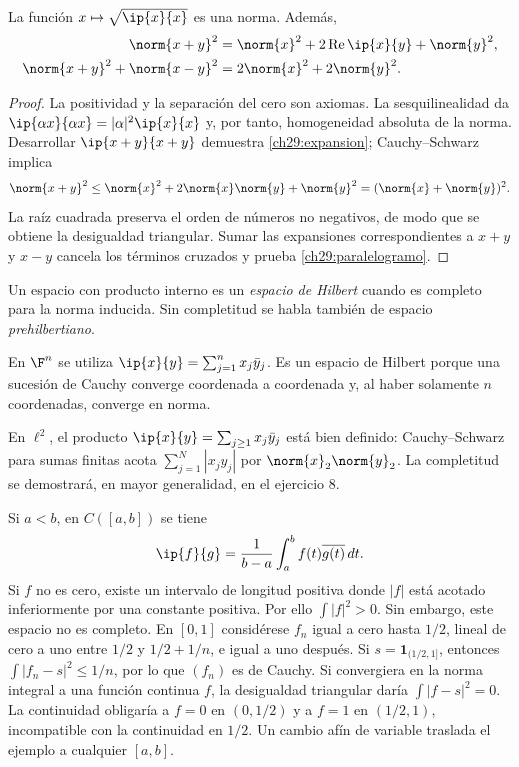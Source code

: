\begin{proposicion}\label{ch29:norma}
La función $x\mapsto\sqrt{\ip{x}{x}}$ es una norma. Además,
\begin{align}
 \norm{x+y}^{2}&=\norm{x}^{2}+2\operatorname{Re}\ip{x}{y}+\norm{y}^{2},\label{ch29:expansion}\\
 \norm{x+y}^{2}+\norm{x-y}^{2}&=2\norm{x}^{2}+2\norm{y}^{2}.\label{ch29:paralelogramo}
\end{align}
\end{proposicion}
\begin{proof}
La positividad y la separación del cero son axiomas. La sesquilinealidad da $\ip{\alpha x}{\alpha x}=|\alpha|^{2}\ip{x}{x}$ y, por tanto, homogeneidad absoluta de la norma. Desarrollar $\ip{x+y}{x+y}$ demuestra \eqref{ch29:expansion}; Cauchy--Schwarz implica
\[
 \norm{x+y}^{2}\leq \norm{x}^{2}+2\norm{x}\norm{y}+\norm{y}^{2}
 =(\norm{x}+\norm{y})^{2}.
\]
La raíz cuadrada preserva el orden de números no negativos, de modo que se obtiene la desigualdad triangular. Sumar las expansiones correspondientes a $x+y$ y $x-y$ cancela los términos cruzados y prueba \eqref{ch29:paralelogramo}.
\end{proof}

\begin{definicion}
Un espacio con producto interno es un \emph{espacio de Hilbert} cuando es completo para la norma inducida. Sin completitud se habla también de espacio \emph{prehilbertiano}.
\end{definicion}

\begin{ejemplo}
En $\F^{n}$ se utiliza $\ip{x}{y}=\sum_{j=1}^{n}x_j\bar y_j$. Es un espacio de Hilbert porque una sucesión de Cauchy converge coordenada a coordenada y, al haber solamente $n$ coordenadas, converge en norma.

En $\ell^{2}$, el producto $\ip{x}{y}=\sum_{j\geq1}x_j\bar y_j$ está bien definido: Cauchy--Schwarz para sumas finitas acota $\sum_{j=1}^{N}|x_jy_j|$ por $\norm{x}_2\norm{y}_2$. La completitud se demostrará, en mayor generalidad, en el ejercicio 8.

Si $a<b$, en $C([a,b])$ se tiene
\[
 \ip{f}{g}=\frac1{b-a}\int_a^b f(t)\overline{g(t)}\,dt.
\]
Si $f$ no es cero, existe un intervalo de longitud positiva donde $|f|$ está acotado inferiormente por una constante positiva. Por ello $\int|f|^{2}>0$. Sin embargo, este espacio no es completo. En $[0,1]$ considérese $f_n$ igual a cero hasta $1/2$, lineal de cero a uno entre $1/2$ y $1/2+1/n$, e igual a uno después. Si $s=\mathbf1_{(1/2,1]}$, entonces $\int|f_n-s|^{2}\leq1/n$, por lo que $(f_n)$ es de Cauchy. Si convergiera en la norma integral a una función continua $f$, la desigualdad triangular daría $\int|f-s|^{2}=0$. La continuidad obligaría a $f=0$ en $(0,1/2)$ y a $f=1$ en $(1/2,1)$, incompatible con la continuidad en $1/2$. Un cambio afín de variable traslada el ejemplo a cualquier $[a,b]$.
\end{ejemplo}

